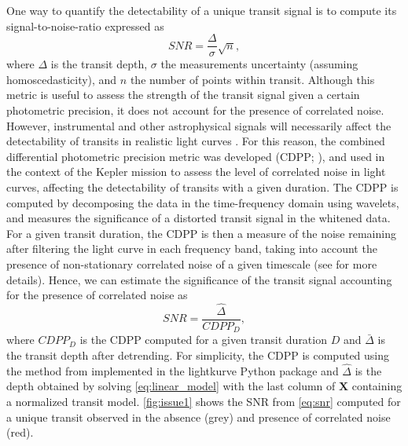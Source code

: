 \documentclass[modern]{aastex631}
\begin{document}
One way to quantify the detectability of a unique transit signal is to compute its signal-to-noise-ratio expressed as 
\begin{equation*}
  SNR= \frac{\Delta}{\sigma}\sqrt{n},
\end{equation*}
where $\Delta$ is the transit depth, $\sigma$ the measurements uncertainty (assuming homoscedasticity), and $n$ the number of points within transit. Although this metric is useful to assess the strength of the transit signal given a certain photometric precision, it does not account for the presence of correlated noise. However, instrumental and other astrophysical signals will necessarily affect the detectability of transits in realistic light curves \citep{Pont2006}. For this reason, the combined differential photometric precision metric was developed (CDPP; \citealt{Jenkins2010}), and used in the context of the Kepler mission to assess the level of correlated noise in light curves, affecting the detectability of transits with a given duration. 
The CDPP is computed by decomposing the data in the time-frequency domain using wavelets, and measures the significance of a distorted transit signal in the whitened data. For a given transit duration, the CDPP is then a measure of the noise remaining after filtering the light curve in each frequency band, taking into account the presence of non-stationary correlated noise of a given timescale (see \citealt{Jenkins2010} for more details). Hence, we can estimate the significance of the transit signal accounting for the presence of correlated noise as
\begin{equation}\label{eq:snr}
  SNR= \frac{\hat{\Delta}}{CDPP_D},
\end{equation}
where $CDPP_D$ is the CDPP computed for a given transit duration $D$ and $\bar{\Delta}$ is the transit depth after detrending. For simplicity, the CDPP is computed using the method from \cite{Gilliland2011} implemented in the \textsf{lightkurve} Python package \citep{Lightkurve} and $\hat{\Delta}$ is the depth obtained by solving \autoref{eq:linear_model} with the last column of $\bm{X}$ containing a normalized transit model. \autoref{fig:issue1} shows the SNR from \autoref{eq:snr} computed for a unique transit observed in the absence (grey) and presence of correlated noise (red).
\end{document}
